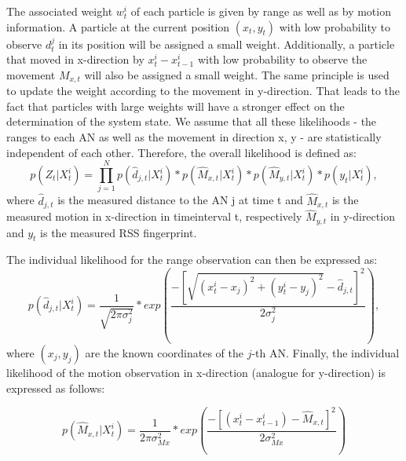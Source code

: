 The associated weight $w^{i}_{t}$ of each particle is given by range as well as by motion information. A particle at the current position $(x_{t},y_{t})$ with low probability to observe $d_{t}^{j}$ in its position will be assigned a small weight. Additionally, a particle that moved in x-direction by $x_{t}^{i}-x_{t-1}^{i}$ with low probability to observe the movement $M_{x,t}$ will also be assigned a small weight. The same principle is used to update the weight according to the movement in y-direction.
That leads to the fact that particles with large weights will have a stronger effect on the determination of the system state.
We assume that all these likelihoods - the ranges to each AN as well as the movement in direction x, y - are statistically independent of each other. Therefore, the overall likelihood is defined as:
\begin{equation}
p(Z_{t} | X^{i}_{t}) = \prod_{j=1}^{N} p(\hat{d}_{j,t}|X_{t}^{i}) * p(\hat{M}_{x,t} | X^{i}_{t}) * p(\hat{M}_{y,t} | X^{i}_{t}) * p(y_t | X^{i}_{t}),
\label{eqn:probability_overall}
\end{equation}
where $\hat{d}_{j,t}$ is the measured distance to the AN j at time t and $\hat{M}_{x,t}$ is the measured motion in x-direction in timeinterval t, respectively $\hat{M}_{y,t}$ in y-direction and $y_t$ is the measured RSS fingerprint.

The individual likelihood for the range observation can then be expressed as:
\begin{equation}
p(\hat{d}_{j,t} | X^{i}_{t}) = \frac{1}{\sqrt{2\pi \sigma_{j}^{2}}} * exp(\frac{-[\sqrt{(x^{i}_{t}-x_{j})^{2}+(y^{i}_{t}-y_{j})^{2}} - \hat{d}_{j,t}]^{2}}{2\sigma_{j}^{2}}),
\label{eqn:probability_individual_distance}
\end{equation}
where $(x_{j},y_{j})$ are the known coordinates of the $j$-th AN.
Finally, the individual likelihood of the motion observation in x-direction (analogue for y-direction) is expressed as follows:

\begin{equation}
p(\hat{M}_{x,t} | X^{i}_{t}) = \frac{1}{2\pi \sigma_{Mx}^{2}} * exp(\frac{-[(x^{i}_{t}-x^{i}_{t-1}) - \hat{M}_{x,t}]^{2}}{2\sigma_{Mx}^{2}})
\label{eqn:probability_individual_movement}
\end{equation}

